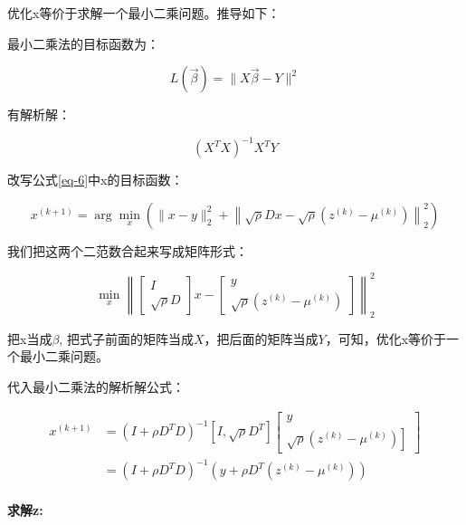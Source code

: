 \documentclass[10pt]{report}
\begin{document}
优化x等价于求解一个最小二乘问题。推导如下：

最小二乘法的目标函数为：

\begin{equation}
L(\vec{\beta})=\|X \vec{\beta}-Y\|^{2}
\end{equation}

有解析解：

\begin{equation}
	(X^TX)^{-1}X^TY
\end{equation}

改写公式\ref{eq-6}中x的目标函数：

\begin{equation}
	x ^{(k+1)} =\arg \min _{ x }\left(\|x-y\|_{2}^{2}+ \left\|\sqrt{\rho}Dx- \sqrt{\rho}(z ^{(k)}- \mu ^{(k)})\right\|_{2}^{2}\right)
\end{equation}

我们把这两个二范数合起来写成矩阵形式：

\begin{equation}
\min _{x}\left\|\left[\begin{array}{c} 
I \\
\sqrt{\rho} D
\end{array}\right] x -\left[\begin{array}{c} 
y \\
\sqrt{\rho}\left( z ^{(k)}- \mu ^{(k)}\right)
\end{array}\right]\right\|_{2}^{2}
\end{equation}

把x当成$\beta$, 把式子前面的矩阵当成$X$，把后面的矩阵当成$Y$，可知，优化x等价于一个最小二乘问题。

代入最小二乘法的解析解公式：

\begin{equation}
\begin{aligned}
x ^{(k+1)} &=\left( I +\rho D^TD \right)^{-1}\left[ I, \sqrt{\rho} D^T \right]\left[\begin{array}{c} 
y \\
\left.\sqrt{\rho}\left( z ^{(k)}- \mu ^{(k)}\right)\right]
\end{array}\right] \\
&=\left( I +\rho D^TD \right)^{-1}\left( y +\rho D^T\left( z ^{(k)}- \mu ^{(k)}\right)\right)
\end{aligned}
\end{equation}

\paragraph{求解z: }
\end{document}
